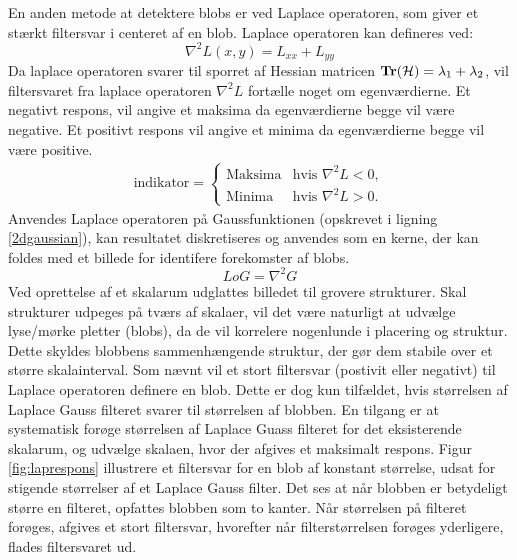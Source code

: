        \vspace{-2.7em}
\noindent
En anden metode at detektere blobs er ved Laplace operatoren, som giver et stærkt filtersvar i centeret af en blob. Laplace operatoren kan defineres ved:
$$
\nabla^2L(x,y) = L_{xx}+L_{yy}
$$
Da laplace operatoren svarer til sporret af Hessian matricen $\bold{Tr}(\mathcal{H}) = \lambda_1 + \lambda_2$, vil filtersvaret fra laplace operatoren $\nabla^2L$ fortælle noget om egenværdierne. Et negativt respons, vil angive et maksima da egenværdierne begge vil være negative. Et positivt respons vil angive et minima da egenværdierne begge vil være positive.
\begin{equation}
\begin{split}
\text{indikator} = 
\begin{cases}
\text{Maksima}& \text{hvis } \nabla^2L < 0,  \\
\text{Minima} & \text{hvis } \nabla^2L > 0.
\end{cases}
\end{split}
\label{laplaceblob}
\end{equation}
Anvendes Laplace operatoren på Gaussfunktionen (opskrevet i ligning \eqref{2dgaussian}), kan resultatet diskretiseres og anvendes som en kerne, der kan foldes med et billede for identifere forekomster af blobs.
\begin{equation}
LoG= \nabla^2 G
\label{lap}
\end{equation}
Ved oprettelse af et skalarum udglattes billedet til grovere strukturer. 
Skal strukturer udpeges på tværs af skalaer, vil det være naturligt at udvælge lyse/mørke pletter (blobs), da de vil korrelere nogenlunde i placering og struktur. Dette skyldes blobbens sammenhængende struktur, der gør dem stabile over et større skalainterval. Som nævnt vil et stort filtersvar (postivit eller negativt) til Laplace operatoren definere en blob. Dette er dog kun tilfældet, hvis størrelsen af Laplace Gauss filteret svarer til størrelsen af blobben. En tilgang er at systematisk forøge størrelsen af Laplace Guass filteret for det eksisterende skalarum, og udvælge skalaen, hvor der afgives et maksimalt respons. Figur \ref{fig:laprespons} illustrere et filtersvar for en blob af konstant størrelse, udsat for stigende størrelser af et Laplace Gauss filter. Det ses at når blobben er betydeligt større en filteret, opfattes blobben som to kanter. Når størrelsen på filteret forøges, afgives et stort filtersvar, hvorefter når filterstørrelsen forøges yderligere, flades filtersvaret ud.
